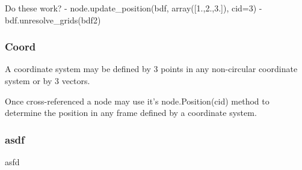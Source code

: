      Do these work?
      - node.update_position(bdf, array([1.,2.,3.]), cid=3) %
      - bdf.unresolve_grids(bdf2) %


  \subsubsection{Coord}
     A coordinate system may be defined by 3 points in any non-circular
     coordinate system or by 3 vectors.

     Once cross-referenced a node may use it's node.Position(cid) method to
     determine the position in any frame defined by a coordinate system.

  \subsubsection{asdf}
     asfd
